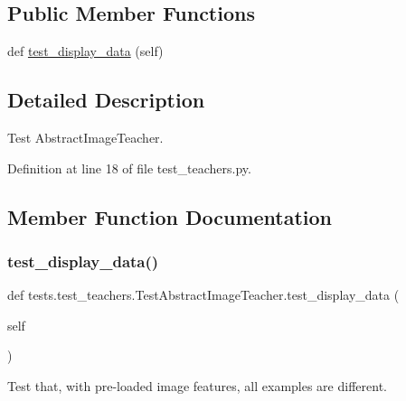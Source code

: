 \subsection*{Public Member Functions}
\begin{DoxyCompactItemize}
\item 
def \hyperlink{classtests_1_1test__teachers_1_1TestAbstractImageTeacher_a7858e68d96209268ee2cfcf23030b7b7}{test\+\_\+display\+\_\+data} (self)
\end{DoxyCompactItemize}


\subsection{Detailed Description}
\begin{DoxyVerb}Test AbstractImageTeacher.
\end{DoxyVerb}
 

Definition at line 18 of file test\+\_\+teachers.\+py.



\subsection{Member Function Documentation}
\mbox{\label{classtests_1_1test__teachers_1_1TestAbstractImageTeacher_a7858e68d96209268ee2cfcf23030b7b7}} 
\subsubsection{\texorpdfstring{test\+\_\+display\+\_\+data()}{test\_display\_data()}}
{\footnotesize\ttfamily def tests.\+test\+\_\+teachers.\+Test\+Abstract\+Image\+Teacher.\+test\+\_\+display\+\_\+data (\begin{DoxyParamCaption}\item[{}]{self }\end{DoxyParamCaption})}

\begin{DoxyVerb}Test that, with pre-loaded image features, all examples are different.
\end{DoxyVerb}
 

